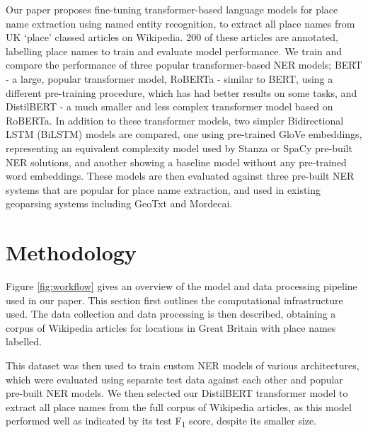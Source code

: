 \documentclass[]{interact}
\theoremstyle{plain}%
\theoremstyle{definition}
\theoremstyle{remark}
\begin{document}
Our paper proposes fine-tuning transformer-based language models for
place name extraction using named entity recognition, to extract all
place names from UK `place' classed articles on Wikipedia. 200 of these
articles are annotated, labelling place names to train and evaluate
model performance. We train and compare the performance of three popular
transformer-based NER models; BERT - a large, popular transformer model,
RoBERTa - similar to BERT, using a different pre-training procedure,
which has had better results on some tasks, and DistilBERT - a much
smaller and less complex transformer model based on RoBERTa. In addition
to these transformer models, two simpler Bidirectional LSTM (BiLSTM)
models are compared, one using pre-trained GloVe embeddings,
representing an equivalent complexity model used by Stanza or SpaCy
pre-built NER solutions, and another showing a baseline model without
any pre-trained word embeddings. These models are then evaluated against
three pre-built NER systems that are popular for place name extraction,
and used in existing geoparsing systems including GeoTxt and Mordecai.

\hypertarget{methodology}{%
\section{Methodology}\label{methodology}}

Figure \ref{fig:workflow} gives an overview of the model and data
processing pipeline used in our paper. This section first outlines the
computational infrastructure used. The data collection and data
processing is then described, obtaining a corpus of Wikipedia articles
for locations in Great Britain with place names labelled.

This dataset was then used to train custom NER models of various
architectures, which were evaluated using separate test data against
each other and popular pre-built NER models. We then selected our
DistilBERT transformer model to extract all place names from the full
corpus of Wikipedia articles, as this model performed well as indicated
by its test F\textsubscript{1} score, despite its smaller size.
\end{document}

